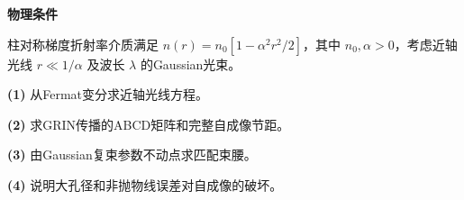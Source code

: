 \textbf{物理条件}\par 柱对称梯度折射率介质满足 \(n(r)=n_0[1-\alpha^2r^2/2]\)，其中 \(n_0,\alpha>0\)，考虑近轴光线 \(r\ll1/\alpha\) 及波长 \(\lambda\) 的Gaussian光束。
\par\noindent\textbf{(1)} 从Fermat变分求近轴光线方程。
\par\noindent\textbf{(2)} 求GRIN传播的ABCD矩阵和完整自成像节距。
\par\noindent\textbf{(3)} 由Gaussian复束参数不动点求匹配束腰。
\par\noindent\textbf{(4)} 说明大孔径和非抛物线误差对自成像的破坏。
